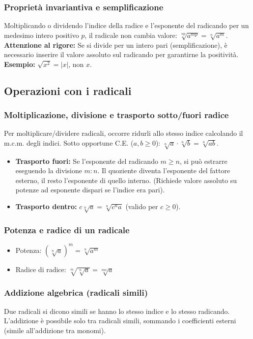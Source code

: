 \subsubsection{Proprietà invariantiva e semplificazione}
Moltiplicando o dividendo l'indice della radice e l'esponente del radicando per un medesimo intero positivo $p$, il radicale non cambia valore: $\sqrt[np]{a^{mp}} = \sqrt[n]{a^m}$.
\textbf{Attenzione al rigore:} Se si divide per un intero pari (semplificazione), è necessario inserire il valore assoluto sul radicando per garantirne la positività.
\textbf{Esempio:} $\sqrt{x^2} = |x|$, non $x$.

\subsection{Operazioni con i radicali}
\subsubsection{Moltiplicazione, divisione e trasporto sotto/fuori radice}
Per moltiplicare/dividere radicali, occorre ridurli allo stesso indice calcolando il m.c.m. degli indici. Sotto opportune C.E. ($a, b \ge 0$): $\sqrt[n]{a} \cdot \sqrt[n]{b} = \sqrt[n]{ab}$.
\begin{itemize}
    \item \textbf{Trasporto fuori:} Se l'esponente del radicando $m \ge n$, si può estrarre eseguendo la divisione $m:n$. Il quoziente diventa l'esponente del fattore esterno, il resto l'esponente di quello interno. (Richiede valore assoluto su potenze ad esponente dispari se l'indice era pari).
    \item \textbf{Trasporto dentro:} $c \sqrt[n]{a} = \sqrt[n]{c^n a}$ (valido per $c \ge 0$).
\end{itemize}

\subsubsection{Potenza e radice di un radicale}
\begin{itemize}
    \item Potenza: $(\sqrt[n]{a})^m = \sqrt[n]{a^m}$
    \item Radice di radice: $\sqrt[m]{\sqrt[n]{a}} = \sqrt[mn]{a}$
\end{itemize}

\subsubsection{Addizione algebrica (radicali simili)}
Due radicali si dicono simili se hanno lo stesso indice e lo stesso radicando. L'addizione è possibile solo tra radicali simili, sommando i coefficienti esterni (simile all'addizione tra monomi).

